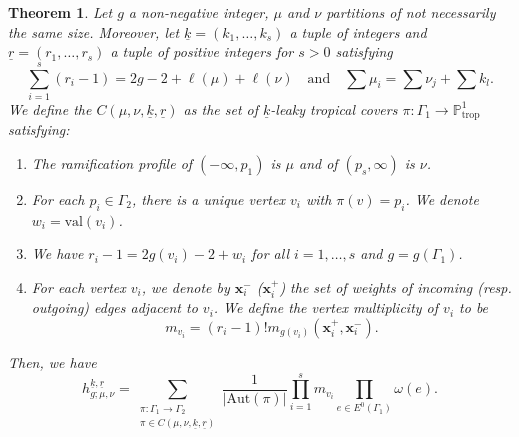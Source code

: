 \documentclass[10pt,a4paper,oneside,no-math,reqno]{amsart}%
\theoremstyle{plain}
\newtheorem{theorem}{Theorem}[section]
\theoremstyle{definition}
\theoremstyle{remark}
\numberwithin{equation}{section}
\newcommand{\mb}[1]{\mathbb{#1}}
\newcommand{\1}{\mathds{1}}
\renewcommand{\P}{\mb{P}}
\newcommand{\<}{\langle}
\renewcommand{\>}{\rangle}
\begin{document}
\begin{theorem}
\label{thm-corr}
    Let $g$ a non-negative integer, $\mu$ and $\nu$ partitions of not necessarily the same size. Moreover, let $\underline{k}=(k_1,\dots,k_s)$ a tuple of integers and $\underline{r}=(r_1,\dots,r_s)$ a tuple of positive integers for $s>0$ satisfying
    \begin{equation}
        \sum_{i=1}^s (r_i - 1) 
        =
        2g-2 + \ell(\mu) + \ell(\nu)
        \quad
        \text{and}
        \quad\sum \mu_i
        =
        \sum\nu_j+\sum k_l.
    \end{equation}
    We define the $C(\mu,\nu,\underline{k},\underline{r})$ as the set of $\underline{k}$-leaky tropical covers $\pi\colon\Gamma_1\to \P^1_{\text{trop}}$ satisfying:
    \begin{enumerate}
        \item The ramification profile of $(-\infty,p_1)$ is $\mu$ and of $(p_s,\infty)$ is $\nu$.
        \item For each $p_i\in \Gamma_2$, there is a unique vertex $v_i$ with $\pi(v)=p_i$. We denote $w_i=\mathrm{val}(v_i)$.
        \item We have $r_i-1 = 2g(v_i)-2+w_i$ for all $i=1,\dots,s$ and $g=g(\Gamma_1)$.
        \item For each vertex $v_i$, we denote by $\textbf{x}^-_{i}$ ($\textbf{x}^+_{i}$) the set of weights of incoming (resp. outgoing) edges adjacent to $v_i$. We define the vertex multiplicity of $v_i$ to be
        \begin{equation}
            m_{v_i}
            =
            (r_i-1)! m_{g(v_i)}(\textbf{x}^+_i,\textbf{x}^-_i).
        \end{equation}
    \end{enumerate}
    Then, we have
    \begin{equation}
        h^{\underline{k},\underline{r}}_{g;\mu,\nu}
        =
        \sum_{\substack{\pi\colon\Gamma_1\to\Gamma_2\\\pi\in C(\mu,\nu,\underline{k},\underline{r})}} \frac{1}{|\mathrm{Aut}(\pi)|} \prod_{i=1}^s m_{v_i} \prod_{e\in E^0(\Gamma_1)} \omega(e).
    \end{equation}
    \end{theorem}
\end{document}

